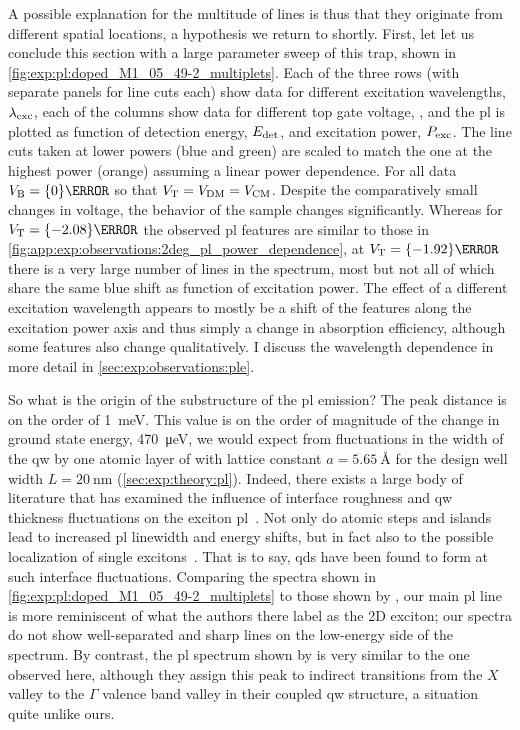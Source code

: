 A possible explanation for the multitude of lines is thus that they originate from different spatial locations, a hypothesis we return to shortly.
First, let let us conclude this section with a large parameter sweep of this trap, shown in \cref{fig:exp:pl:doped_M1_05_49-2_multiplets}.
Each of the three rows (with separate panels for line cuts each) show data for different excitation wavelengths, $\lambda_{\mathrm{exc}}$, each of the columns show data for different top gate voltage, \VT, and the \gls{pl} is plotted as function of detection energy, $E_{\mathrm{det}}$, and excitation power, $P_{\mathrm{exc}}$.
The line cuts taken at lower powers (blue and green) are scaled to match the one at the highest power (orange) assuming a linear power dependence.
For all data $\VB = \qty{0}{\volt}$ so that $V_{\mathrm{T}} = V_{\mathrm{DM}} = V_{\mathrm{CM}}$.
Despite the comparatively small changes in voltage, the behavior of the sample changes significantly.
Whereas for $\VT = \qty{-2.08}{\volt}$ the observed \gls{pl} features are similar to those in \cref{fig:app:exp:observations:2deg_pl_power_dependence},
at $\VT = \qty{-1.92}{\volt}$ there is a very large number of lines in the spectrum, most but not all of which share the same blue shift as function of excitation power.
The effect of a different excitation wavelength appears to mostly be a shift of the features along the excitation power axis and thus simply a change in absorption efficiency, although some features also change qualitatively.
I discuss the wavelength dependence in more detail in \cref{sec:exp:observations:ple}.

So what is the origin of the substructure of the \gls{pl} emission?
The peak distance is on the order of \qty{1}{\milli\electronvolt}.
This value is on the order of magnitude of the change in ground state energy, \qty{470}{\micro\electronvolt}, we would expect from fluctuations in the width of the \gls{qw} by one atomic layer of  with lattice constant $a = \qty{5.65}{\angstrom}$
for the design well width $L = \qty{20}{\nano\meter}$ (\cref{sec:exp:theory:pl}).
Indeed, there exists a large body of literature that has examined the influence of interface roughness and \gls{qw} thickness fluctuations on the exciton \gls{pl}~\cite{Tanaka1987,Gammon1991,Leosson2000}.
Not only do atomic steps and islands lead to increased \gls{pl} linewidth and energy shifts, but in fact also to the possible localization of single excitons~\cite{Brunner1994,Brunner1994a,Zrenner1994}.
That is to say, \glspl{qd} have been found to form at such interface fluctuations.
Comparing the spectra shown in \cref{fig:exp:pl:doped_M1_05_49-2_multiplets} to those shown by \citet[Figure~1]{Brunner1994}, our main \gls{pl} line is more reminiscent of what the authors there label as the 2D exciton; our spectra do not show well-separated and sharp lines on the low-energy side of the spectrum.
By contrast, the \gls{pl} spectrum shown by \citet[Figure~1]{Zrenner1994} is very similar to the one observed here, although they assign this peak to indirect transitions from the  $X$ valley to the  $\Gamma$ valence band valley in their  coupled \gls{qw} structure, a situation quite unlike ours.

